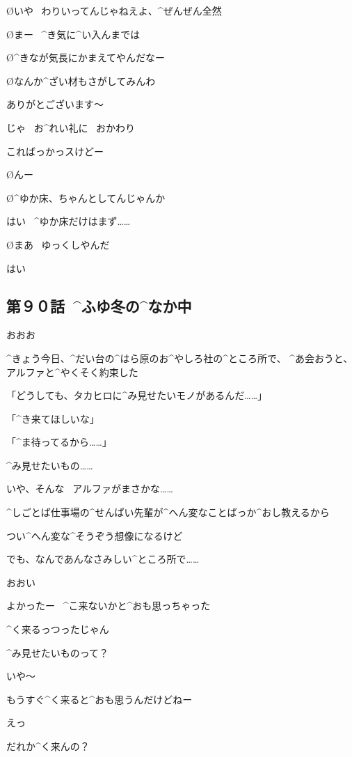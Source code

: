 \O いや
\ わりいってんじゃねえよ、^{ぜんぜん}{全然}

\O まー
\ ^{き}{気}に^{い}{入}んまでは

\O ^{きなが}{気長}にかまえてやんだなー

\O なんか^{ざい}{材}もさがしてみんわ

\A ありがとございます〜

\page
\A じゃ
\ お^{れい}{礼}に
\ おかわり

\A こればっかっスけどー

\O んー

\page
\O ^{ゆか}{床}、ちゃんとしてんじゃんか

\A はい
\ ^{ゆか}{床}だけはまず……

\page
\O まあ
\ ゆっくしやんだ

\A はい


\subsection{第９０話\ ^{ふゆ}{冬}の^{なか}{中}}

\page[19]
\A おおお

\page
\T ^{きょう}{今日}、^{だい}{台}の^{はら}{原}のお^{やしろ}{社}の^{ところ}{所}で、
^{あ}{会}おうと、アルファと^{やくそく}{約束}した

\A 「どうしても、タカヒロに^{み}{見}せたいモノがあるんだ……」

\A 「^{き}{来}てほしいな」

\A 「^{ま}{待}ってるから……」

\T ^{み}{見}せたいもの……

\page
\T いや、そんな
\ アルファがまさかな……

\T ^{しごとば}{仕事場}の^{せんぱい}{先輩}が^{へん}{変}なことばっか^{おし}{教}えるから

\T つい^{へん}{変}な^{そうぞう}{想像}になるけど

\T でも、なんであんなさみしい^{ところ}{所}で……

\page[23]
\A おおい

\A よかったー
\ ^{こ}{来}ないかと^{おも}{思}っちゃった

\T ^{く}{来}るっつったじゃん

\page
\T ^{み}{見}せたいものって？

\A いや〜

\A もうすぐ^{く}{来}ると^{おも}{思}うんだけどねー

\T えっ

\T だれか^{く}{来}んの？

